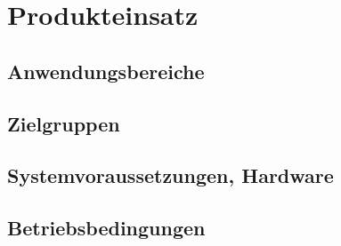 
\section{Produkteinsatz}


\subsection{Anwendungsbereiche}


\subsection{Zielgruppen}


\subsection{Systemvoraussetzungen, Hardware}


\subsection{Betriebsbedingungen}


